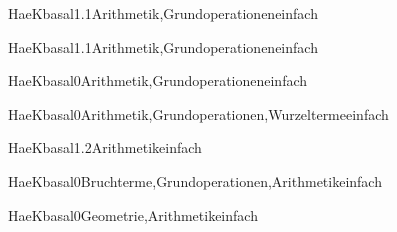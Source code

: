 \documentclass[12pt]{article}
\begin{document}
\begin{Add}{HaeK}{basal1.1}{Arithmetik,Grundoperationen}{einfach}
\end{Add}

\begin{Add}{HaeK}{basal1.1}{Arithmetik,Grundoperationen}{einfach}
\end{Add}

\begin{Add}{HaeK}{basal0}{Arithmetik,Grundoperationen}{einfach}
\end{Add}

\begin{Add}{HaeK}{basal0}{Arithmetik,Grundoperationen,Wurzelterme}{einfach}
\end{Add}

\begin{Add}{HaeK}{basal1.2}{Arithmetik}{einfach}
\end{Add}

\begin{Add}{HaeK}{basal0}{Bruchterme,Grundoperationen,Arithmetik}{einfach}
\end{Add}

\begin{Add}{HaeK}{basal0}{Geometrie,Arithmetik}{einfach}
\end{Add}
\end{document}
